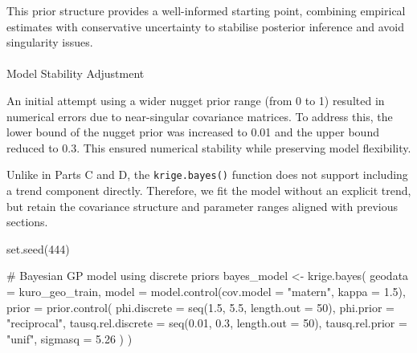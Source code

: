 \documentclass[
  11pt,
]{article}
\makeatletter
\let\oldparagraph\paragraph
\renewcommand{\paragraph}{
    \@ifstar
      \xxxParagraphStar
      \xxxParagraphNoStar
  }
\newcommand{\xxxParagraphStar}[1]{\oldparagraph*{#1}\mbox{}}
\newcommand{\xxxParagraphNoStar}[1]{\oldparagraph{#1}\mbox{}}
\newenvironment{Shaded}{\begin{snugshade}}{\end{snugshade}}
\newcommand{\AttributeTok}[1]{\textcolor[rgb]{0.40,0.45,0.13}{#1}}
\newcommand{\CommentTok}[1]{\textcolor[rgb]{0.37,0.37,0.37}{#1}}
\newcommand{\DecValTok}[1]{\textcolor[rgb]{0.68,0.00,0.00}{#1}}
\newcommand{\FloatTok}[1]{\textcolor[rgb]{0.68,0.00,0.00}{#1}}
\newcommand{\FunctionTok}[1]{\textcolor[rgb]{0.28,0.35,0.67}{#1}}
\newcommand{\NormalTok}[1]{\textcolor[rgb]{0.00,0.23,0.31}{#1}}
\newcommand{\OtherTok}[1]{\textcolor[rgb]{0.00,0.23,0.31}{#1}}
\newcommand{\SpecialCharTok}[1]{\textcolor[rgb]{0.37,0.37,0.37}{#1}}
\newcommand{\StringTok}[1]{\textcolor[rgb]{0.13,0.47,0.30}{#1}}
\makeatother
\begin{document}
This prior structure provides a well-informed starting point, combining
empirical estimates with conservative uncertainty to stabilise posterior
inference and avoid singularity issues.

\paragraph{Model Stability Adjustment}\label{model-stability-adjustment}

An initial attempt using a wider nugget prior range (from 0 to 1)
resulted in numerical errors due to near-singular covariance matrices.
To address this, the lower bound of the nugget prior was increased to
0.01 and the upper bound reduced to 0.3. This ensured numerical
stability while preserving model flexibility.

Unlike in Parts C and D, the \texttt{krige.bayes()} function does not
support including a trend component directly. Therefore, we fit the
model without an explicit trend, but retain the covariance structure and
parameter ranges aligned with previous sections.

\begin{Shaded}
\begin{Highlighting}[]
\FunctionTok{set.seed}\NormalTok{(}\DecValTok{444}\NormalTok{)}

\CommentTok{\# Bayesian GP model using discrete priors}
\NormalTok{bayes\_model }\OtherTok{\textless{}{-}} \FunctionTok{krige.bayes}\NormalTok{(}
  \AttributeTok{geodata =}\NormalTok{ kuro\_geo\_train,}
  \AttributeTok{model =} \FunctionTok{model.control}\NormalTok{(}\AttributeTok{cov.model =} \StringTok{"matern"}\NormalTok{, }\AttributeTok{kappa =} \FloatTok{1.5}\NormalTok{),}
  \AttributeTok{prior =} \FunctionTok{prior.control}\NormalTok{(}
    \AttributeTok{phi.discrete =} \FunctionTok{seq}\NormalTok{(}\FloatTok{1.5}\NormalTok{, }\FloatTok{5.5}\NormalTok{, }\AttributeTok{length.out =} \DecValTok{50}\NormalTok{),}
    \AttributeTok{phi.prior =} \StringTok{"reciprocal"}\NormalTok{,}
    \AttributeTok{tausq.rel.discrete =} \FunctionTok{seq}\NormalTok{(}\FloatTok{0.01}\NormalTok{, }\FloatTok{0.3}\NormalTok{, }\AttributeTok{length.out =} \DecValTok{50}\NormalTok{),}
    \AttributeTok{tausq.rel.prior =} \StringTok{"unif"}\NormalTok{,}
    \AttributeTok{sigmasq =} \FloatTok{5.26}
\NormalTok{  )}
\NormalTok{)}
\end{Highlighting}
\end{Shaded}

\begin{Shaded}
\end{Shaded}
\end{document}
